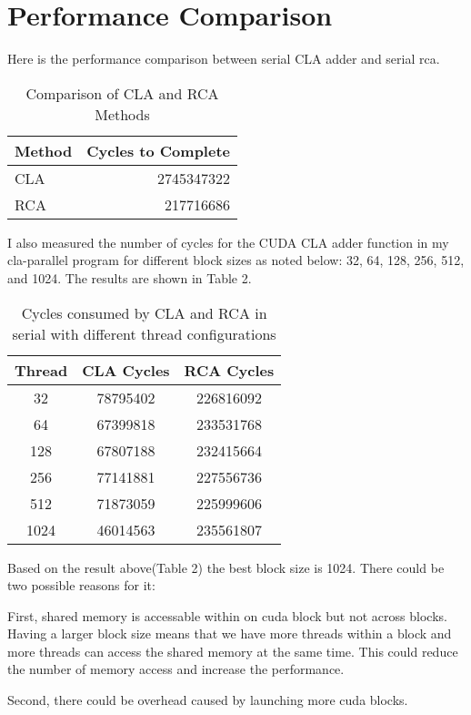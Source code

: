\documentclass[11pt]{article}
\begin{document}
\section{Performance Comparison}
Here is the performance comparison between serial CLA adder and serial rca. 
\begin{table}[h]
    \centering
    \begin{tabular}{@{}lr@{}}
    \toprule
    Method & Cycles to Complete \\
    \midrule
    CLA & 2745347322 \\
    RCA & 217716686 \\
    \bottomrule
    \end{tabular}
    \caption{Comparison of CLA and RCA Methods}
    \end{table}
    

I also measured the number of cycles for the CUDA CLA adder function in my cla-parallel program for different block sizes as noted below: 32, 64, 128, 256, 512, and 1024. The results are shown in Table 2.


\begin{table}[h]
    \centering
    \begin{tabular}{ccc}
    \toprule
    Thread & CLA Cycles & RCA Cycles \\
    \midrule
    32 & 78795402 & 226816092 \\
    64 & 67399818 & 233531768 \\
    128 & 67807188 & 232415664 \\
    256 & 77141881 & 227556736 \\
    512 & 71873059 & 225999606 \\
    1024 & 46014563 & 235561807 \\
    \bottomrule
    \end{tabular}
    \caption{Cycles consumed by CLA and RCA in serial with different thread configurations}
    \label{tab:serial}
\end{table}

Based on the result above(Table 2) the best block size is 1024. There could be two possible reasons for it: 

First, shared memory is accessable within on cuda block but not across blocks. Having a larger block size 
means that we have more threads within a block and more threads can access the shared memory at the same time. 
This could reduce the number of memory access and increase the performance.

Second, there could be overhead caused by launching more cuda blocks.
\end{document}
